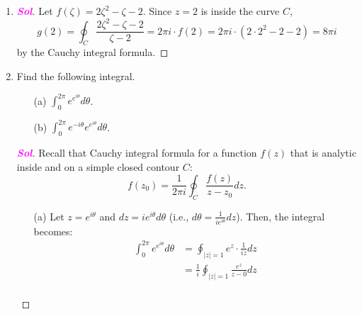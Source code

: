 \documentclass{article}
\newcommand{\ie}{\textnormal{i.e.}}
\theoremstyle{definition}
\newcommand{\of}[1]{\left( #1 \right)}
\newcommand{\abs}[1]{\left\lvert #1 \right\rvert}
\newcommand{\sol}{\textcolor{magenta}{\bf Sol}}
\begin{document}
\begin{enumerate}
\begin{proof}[\sol]
\begin{itemize}
\[				\oint_C\frac{e^z}{z}dz=\oint_C\frac{f\of{z}}{z-0}dz=2\pi i\cdot e^0 =2\pi i.
				\] by the Cauchy integral formula.
				\vspace{4pt}
				\item[(b)] Let $f\of{z}=z^2$ then \[
				\oint_C\frac{z^2}{z-1}dz=\oint_C\frac{f\of{z}}{z-1}dz=2\pi i\cdot(1)^2=2\pi i.
				\] by the Cauchy integral formula.
				\vspace{4pt}
				\item[(c)] Since $z_0=3$ is not inside the curve $C$, \[
				\oint_C\frac{z}{z-3}dz=0
				\] by Cauchy-Goursat theorem.
				\vspace{4pt}
				\item[(d)] Let $f\of{z}=\displaystyle\frac{\cos z}{\of{z+3i}\of{z-3i}}$ then \[
				\oint_C\frac{\of{\cos z}}{z\of{z^2+9}}dz = 2\pi i\cdot \frac{\cos 0}{3i\cdot(-3i)}=\frac{2\pi i}{9}.
				\]
			\end{itemize}
		\end{proof}
		\item 
		\begin{proof}[\sol]
			Let $f\of{\zeta}=2\zeta^2-\zeta-2$. Since $z=2$ is inside the curve $C$, \[
			g\of{2}=\oint_C\frac{2\zeta^2-\zeta-2}{\zeta-2}=2\pi i\cdot f\of{2}=2\pi i\cdot(2\cdot 2^2-2-2)=8\pi i
			\] by the Cauchy integral formula.
		\end{proof}
		\item Find the following integral. \begin{itemize}
			\item[(a)] $\displaystyle\int_0^{2\pi}e^{e^{i\theta}}d\theta$.
			\item[(b)] $\displaystyle\int_0^{2\pi}e^{-i\theta}e^{e^{i\theta}}d\theta$.
		\end{itemize}
		\begin{proof}[\sol]
			Recall that Cauchy integral formula for a function $f\of{z}$ that is analytic inside and on a simple closed contour $C$: \[
			f\of{z_0}=\frac{1}{2\pi i}\oint_C\frac{f\of{z}}{z-z_0}dz.
			\]
			\vspace{4pt}
			\begin{itemize}
				\item[(a)] Let $z = e^{i\theta}$ and $dz = ie^{i\theta} d\theta$ (\ie, $d\theta=\frac{1}{ie^{i\theta}}dz$). Then, the integral becomes: \begin{align*}
				\int_0^{2\pi}e^{e^{i\theta}}d\theta&=\oint_{\abs{z}=1}e^z\cdot\frac{1}{iz}dz\\
				&=\frac{1}{i}\oint_{\abs{z}=1}\frac{e^z}{z-0}dz\\

\end{align*}
\end{itemize}
\end{proof}
\end{enumerate}
\end{document}
